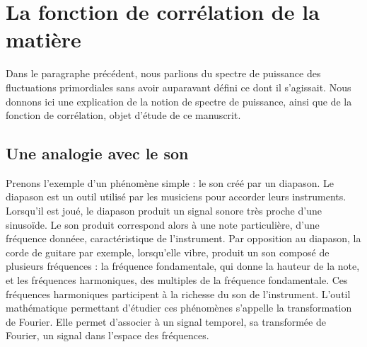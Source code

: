 \documentclass[11pt, twoside, a4paper, openright]{report}
\begin{document}
\section{La fonction de corrélation de la matière}

Dans le paragraphe précédent, nous parlions du spectre de puissance des fluctuations primordiales sans avoir auparavant défini ce dont il s'agissait. Nous donnons ici une explication de la notion de spectre de puissance, ainsi que de la fonction de corrélation, objet d'étude de ce manuscrit.

\subsection{Une analogie avec le son}

Prenons l'exemple d'un phénomène simple : le son créé par un diapason. Le diapason est un outil utilisé par les musiciens pour accorder leurs instruments. Lorsqu'il est joué, le diapason produit un signal sonore très proche d'une sinusoïde.
Le son produit correspond alors à une note particulière, d'une fréquence donnéee, caractéristique de l'instrument. Par opposition au diapason, la corde de guitare par exemple, lorsqu'elle vibre, produit un son composé de plusieurs fréquences : la fréquence fondamentale, qui donne la hauteur de la note, et les fréquences harmoniques, des multiples de la fréquence fondamentale. Ces fréquences harmoniques participent à la richesse du son de l'instrument. L'outil mathématique permettant d'étudier ces phénomènes s'appelle la transformation de Fourier. Elle permet d'associer à un signal temporel, sa transformée de Fourier, un signal dans l'espace des fréquences.
\end{document}
